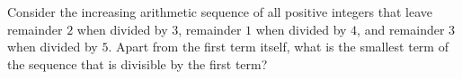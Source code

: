 Consider the increasing arithmetic sequence of all positive integers that leave remainder $2$ when divided by $3$, remainder $1$ when divided by $4$, and remainder $3$ when divided by $5$. Apart from the first term itself, what is the smallest term of the sequence that is divisible by the first term?
